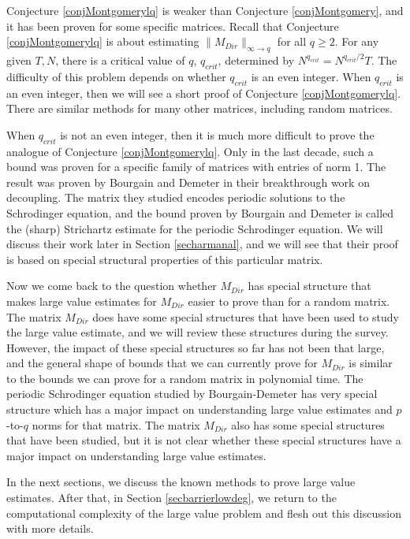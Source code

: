 \documentclass{amsart}
\begin{document}
Conjecture \ref{conjMontgomerylq} is weaker than Conjecture \ref{conjMontgomery},  and it has been proven for some specific matrices.   Recall that Conjecture \ref{conjMontgomerylq} is about estimating $\| M_{Dir} \|_{\infty \rightarrow q}$ for all $q \ge 2$.   For any given $T, N$,  there is a critical value of $q$,  $q_{crit}$,  determined by $N^{q_{crit}} = N^{q_{crit}/2} T$.   The difficulty of this problem depends on whether $q_{crit}$ is an even integer.  When $q_{crit}$ is an even integer,  then we will see a short proof of Conjecture \ref{conjMontgomerylq}.   There are similar methods for many other matrices,  including random matrices.

When $q_{crit}$ is not an even integer,  then it is much more difficult to prove the analogue of Conjecture \ref{conjMontgomerylq}.   Only in the last decade,  such a bound was proven for a specific family of matrices with entries of norm 1.   The result was proven by Bourgain and Demeter \cite{BD} in their breakthrough work on decoupling.   The matrix they studied encodes periodic solutions to the Schrodinger equation,  and the bound proven by Bourgain and Demeter is called the (sharp) Strichartz estimate for the periodic Schrodinger equation.   We will discuss their work later in Section \ref{secharmanal}, and we will see that their proof is based on special structural properties of this particular matrix.   

Now we come back to the question whether $M_{Dir}$ has special structure that makes large value estimates for $M_{Dir}$ easier to prove than for a random matrix.  The matrix $M_{Dir}$ does have some special structures that have been used to study the large value estimate, and we will review these structures during the survey.  However, the impact of these special structures so far has not been that large, and the general shape of bounds that we can currently prove for $M_{Dir}$ is similar to the bounds we can prove for a random matrix in polynomial time.  The periodic Schrodinger equation studied by Bourgain-Demeter has very special structure which has a major impact on understanding large value estimates and $p$-to-$q$ norms for that matrix.  The matrix $M_{Dir}$ also has some special structures that have been studied, but it is not clear whether these special structures have a major impact on understanding large value estimates.  

In the next sections, we discuss the known methods to prove large value estimates.  After that, in Section \ref{secbarrierlowdeg}, we return to the computational complexity of the large value problem and flesh out this discussion with more details. 
\end{document}
